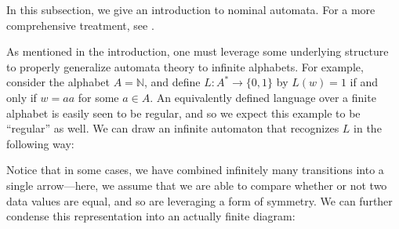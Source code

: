 \documentclass[runningheads]{llncs}
\newcommand{\bb}{\mathbb}
\begin{document}
In this subsection, we give an introduction to nominal automata.
For a more comprehensive treatment, see \cite{bojanczyk-klin-lasota:automata-theory-in-nominal-sets}.

As mentioned in the introduction, one must leverage some underlying structure to properly generalize automata theory to infinite alphabets.
For example, consider the alphabet $A = \bb N$, and define $L : A^* \to \{0,1\}$ by $L(w) = 1$ if and only if $w = aa$ for some $a \in A$.
An equivalently defined language over a finite alphabet is easily seen to be regular, and so we expect this example to be ``regular'' as well. We can draw an infinite automaton that recognizes $L$ in the following way:

\begin{center}
\end{center}

Notice that in some cases, we have combined infinitely many transitions into a single arrow---here, we assume that we are able to compare whether or not two data values are equal, and so are leveraging a form of symmetry.
We can further condense this representation into an actually finite diagram:

\begin{center}
\end{center}
\end{document}
